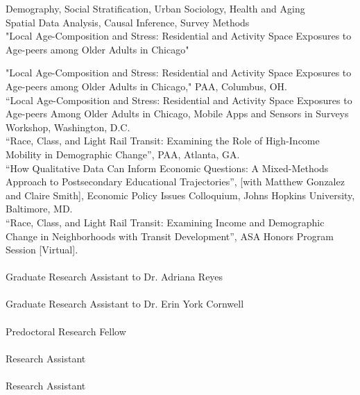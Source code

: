 \documentclass[10pt]{article} %
\begin{document}
\large{} Demography, Social Stratification, Urban Sociology, Health and Aging \\
\large{} Spatial Data Analysis, Causal Inference, Survey Methods \\


"Local Age-Composition and Stress: Residential and Activity Space Exposures to Age-peers among Older Adults in Chicago" \\



 "Local Age-Composition and Stress: Residential and Activity Space Exposures to Age-peers among Older Adults in Chicago," PAA, Columbus, OH. \\

“Local Age-Composition and Stress: Residential and Activity Space Exposures to Age-peers Among Older Adults in Chicago, Mobile Apps and Sensors in Surveys Workshop, Washington, D.C. \\

 “Race, Class, and Light Rail Transit: Examining the Role of High-Income Mobility in Demographic Change”, PAA, Atlanta, GA. \\

 “How Qualitative Data Can Inform Economic Questions: A Mixed-Methods Approach to Postsecondary Educational Trajectories”, [with Matthew Gonzalez and Claire Smith], Economic Policy Issues Colloquium, Johns Hopkins University, Baltimore, MD. \\
 
  “Race, Class, and Light Rail Transit: Examining Income and Demographic Change in Neighborhoods with Transit Development”, ASA Honors Program Session [Virtual]. \\

 \\ 
Graduate Research Assistant to Dr. Adriana Reyes \\
 \\ 
Graduate Research Assistant to Dr. Erin York Cornwell \\  
 \\ Predoctoral Research Fellow \\
 \\ Research Assistant \\ 
 \\ Research Assistant \\ 
\end{document}
